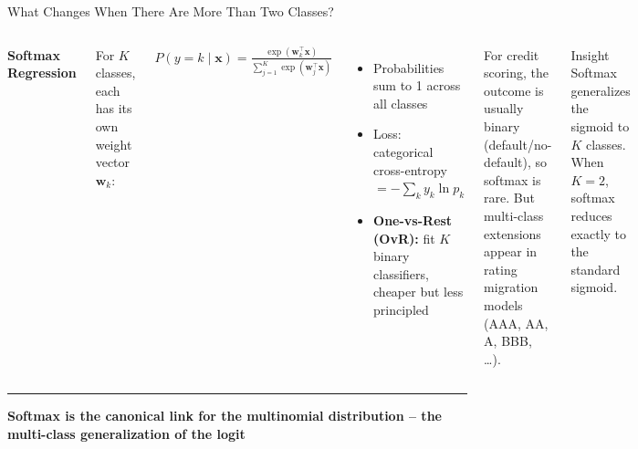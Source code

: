 \documentclass[8pt,aspectratio=169]{beamer}
\newcommand{\bottomnote}[1]{%
\vfill
\vspace{-2mm}
\textcolor{mllavender2}{\rule{\textwidth}{0.4pt}}
\vspace{1mm}
\footnotesize
\textbf{#1}
}
\newenvironment{compactlist}{%
  \begin{itemize}%
    \setlength{\itemsep}{2pt}%
    \setlength{\parskip}{0pt}%
    \setlength{\parsep}{0pt}%
}{%
  \end{itemize}%
}
\begin{document}
\begin{frame}[t]{What Changes When There Are More Than Two Classes?}
\begin{columns}[T]
\small
\textbf{Softmax Regression}

\scriptsize
For $K$ classes, each has its own weight vector $\mathbf{w}_k$:

\vspace{2mm}
$\displaystyle P(y=k \mid \mathbf{x}) = \frac{\exp(\mathbf{w}_k^\top \mathbf{x})}{\sum_{j=1}^{K}\exp(\mathbf{w}_j^\top \mathbf{x})}$

\vspace{2mm}
\begin{compactlist}
\item Probabilities sum to 1 across all classes
\item Loss: categorical cross-entropy $= -\sum_k y_k \ln p_k$
\item \textbf{One-vs-Rest (OvR):} fit $K$ binary classifiers, cheaper but less principled
\end{compactlist}

\vspace{1mm}
\scriptsize
For credit scoring, the outcome is usually binary (default/no-default), so softmax is rare. But multi-class extensions appear in rating migration models (AAA, AA, A, BBB, \ldots).

\begin{block}{Insight}
\scriptsize Softmax generalizes the sigmoid to $K$ classes. When $K=2$, softmax reduces exactly to the standard sigmoid.
\end{block}

\footnotesize
\vspace{4mm}
\end{columns}

\bottomnote{Softmax is the canonical link for the multinomial distribution -- the multi-class generalization of the logit}
\end{frame}
\end{document}
